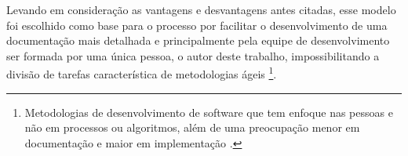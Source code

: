 Levando em consideração as vantagens e desvantagens antes citadas, esse modelo foi escolhido como base para o processo por facilitar o desenvolvimento de uma documentação mais detalhada e 
principalmente pela equipe de desenvolvimento ser formada por uma única pessoa, o autor deste trabalho, impossibilitando a divisão de tarefas característica de metodologias 
ágeis \footnote{Metodologias de desenvolvimento de software que tem enfoque nas pessoas e não em processos ou algoritmos, além de uma preocupação menor em documentação e maior em implementação 
\cite{michel2004metodologias}.}.

\begin{figure}[H]
    \centering
\end{figure}


